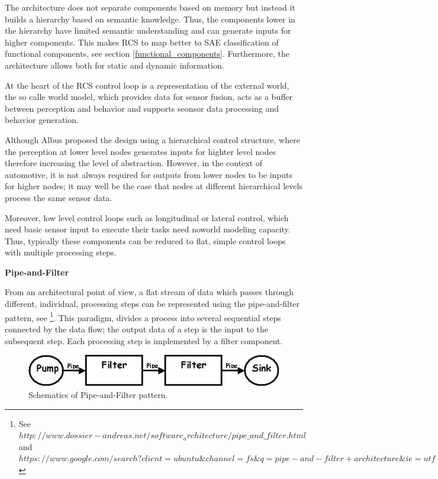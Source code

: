 The architecture does not separate components based on memory but instead it builds a hierarchy based on semantic knowledge. Thus, the components
lower in the hierarchy have limited semantic understanding and can generate inputs for higher components. This makes RCS to map better to SAE classification of 
functional components, see section \ref{functional_components}. Furthermore, the architecture allows both for static and dynamic information.

At the heart of the RCS control loop is a representation of the external world, the so calle world model, which provides data for sensor fusion, acts as a 
buffer between perception and behavior and supports seonsor data processing and behavior generation.

Although Albus proposed the design using a hierarchical control structure, where the perception at lower level nodes generates inputs for highter 
level nodes therefore increasing the level of abstraction. However, in the context of automotive, it is not always required for outputs from lower nodes to
be inputs for higher nodes; it may well be the case that nodes at different hierarchical levels process the same sensor data.  

Moreover, low level control loops such as longitudinal or lateral control, which need basic sensor input to execute their tasks need noworld modeling capacity. Thus, typically these
components can be reduced to flat, simple control loops with multiple processing steps. 


\begin{framed}
\theoremstyle{remark}
\begin{remark}{\textbf{Pipe-and-Filter}}

From an architectural point of view, a flat stream of data which passes through different, individual, 
processing steps can be represented using the pipe-and-filter pattern, see \footnote{See $http://www.dossier-andreas.net/software_architecture/pipe\_and\_filter.html$ and $https://www.google.com/search?client=ubuntu\&channel=fs\&q=pipe-and-filter+architecture\&ie=utf-8\&oe=utf-8$}. 
This paradigm, divides a process into several sequential steps connected by the data flow; the output data of a step is the input to the 
subsequent step. Each processing step is implemented by a filter component.  

\end{remark}
\end{framed}

\begin{figure}[!htb]
\begin{center}
\includegraphics[scale=0.380]{img/pipe_and_filter_2.jpg}
\end{center}
\caption{Schematics of Pipe-and-Filter pattern.}
\label{pipe_and_filter_2}
\end{figure}



